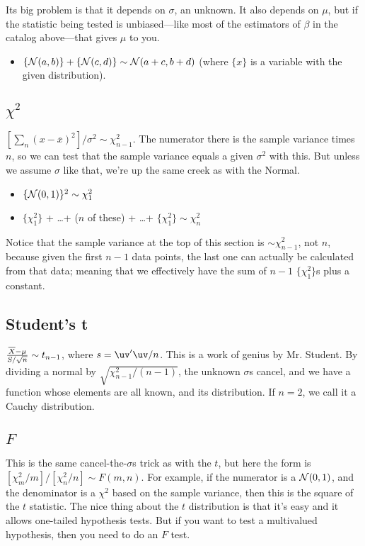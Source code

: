 Its big problem is that it depends on $\sigma$, an
unknown. It also depends on $\mu$, but if the statistic
being tested is unbiased---like most of the estimators of $\beta$ in the
catalog above---that gives $\mu$ to you.

\begin{itemize}
\item $\{{\cal N} (a,b)\} + \{{\cal N} (c,d)\} \sim {\cal N}
(a+c,b+d)$ (where $\{x\}$ is a variable with the given distribution).
\end{itemize}

\subsection{$\chi^2$} $[\sum_n (x-\overline
x)^2]/\sigma^2\sim \chi^2_{n-1}$. The numerator there is the sample
variance times $n$, so we can test that the sample variance equals a
given $\sigma^2$ with this. But unless we assume $\sigma$ like that,
we're up the same creek as with the Normal.

\begin{itemize}
\item $\{{\cal N} (0,1)\}^2 \sim \chi^2_1$

\item $\{\chi^2_1\}$ + \dots + ($n$ of these) + \dots + $\{\chi^2_1\} \sim \chi^2_n$

\end{itemize}			\label{chisq}

Notice that the sample variance at the top of this section is $\sim
\chi^2_{n-1}$, not $n$, because given the first $n-1$ data points, the
last one can actually be calculated from that data; meaning that we
effectively have the sum of $n-1$ $\{\chi^2_1\}$s plus a constant.

\subsection{Student's t}  ${\overline X - \mu \over S/\sqrt{n}}\sim
t_{n-1}$, where $s=\uv'\uv/n$. This is a work of genius by Mr. Student.
By dividing a normal by $\sqrt{\chi^2_{n-1}/(n-1)}$, the unknown
$\sigma$s cancel, and we have a function whose elements are all known,
and its distribution.  If $n=2$, we call it a Cauchy distribution.
\label{tstat}


\subsection{$F$}  This is the same cancel-the-$\sigma$s trick as with the $t$, but here the form
is $[\chi^2_m/m]/[\chi^2_n/n]\sim F(m,n)$. For example, if the numerator
is a ${\cal N}(0,1)$, and the denominator is a $\chi^2$ based on the
sample variance, then this is the square of the $t$ statistic.
The nice thing about the $t$ distribution is that it's easy and it
allows one-tailed hypothesis tests. But if you want to test a
multivalued hypothesis, then you need to do an $F$ test.

